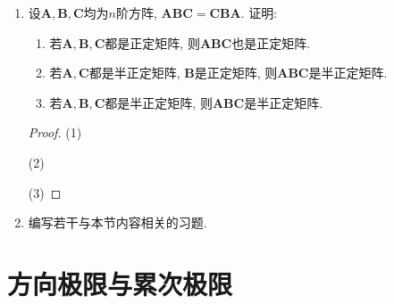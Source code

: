 \begin{3b}
\begin{enumerate}
\begin{enumerate}[label=(\arabic*)]
    \item 若\(\boldsymbol{A,B}\)都是正定矩阵, 则\(\boldsymbol{AB}\)也是正定矩阵.
    \item  若\(\boldsymbol{A,B}\)都是半正定矩阵, 则\(\boldsymbol{AB}\)也是半正定矩阵.
\end{enumerate}
\begin{proof}
(1)由于\(\boldsymbol{A}\)正定, 则有非异阵\(\boldsymbol{C}\)满足\(\boldsymbol{A}=\boldsymbol{C}^{\rm T}\boldsymbol{C}\), 
这是因为\(\boldsymbol{A}\)正定当且仅当\(\boldsymbol{A}\)合同于\(\boldsymbol{I}_n\), 
由于\(\boldsymbol{AB}=\boldsymbol{BA}\)且\(\boldsymbol{A,B}\)都是正定矩阵, 
于是\(\left(\boldsymbol{AB}\right)^{\rm T}=\boldsymbol{B}^{\rm T}\boldsymbol{A}^{\rm T}=\boldsymbol{BA}=\boldsymbol{AB}\), 从而\(\boldsymbol{AB}\)是对称的. 另一方面
\[\boldsymbol{AB}=\boldsymbol{BA}=\boldsymbol{BC}^{\rm T}\boldsymbol{C}=\boldsymbol{C}^{-1}\boldsymbol{CBC}^{\rm T}\boldsymbol{C},\]
从而\(\boldsymbol{AB}\)与\(\boldsymbol{CBC}^{\rm T}\)相似, 后者显然是正定的, 从而\(\boldsymbol{AB}\)正定.

(2)我们先证明, \(n\)阶实对称矩阵\(\boldsymbol{A}\)是半正定矩阵的充分必要条件是对于任意正实数\(t\), \(\boldsymbol{A}+t\boldsymbol{I}_n\)都是正定阵.
\end{proof}
\item 设\(\boldsymbol{A},\boldsymbol{B},\boldsymbol{C}\)均为\(n\)阶方阵, \(\boldsymbol{ABC=CBA}\). 证明:
\begin{enumerate}[label=(\arabic*)]
    \item 若\(\boldsymbol{A},\boldsymbol{B},\boldsymbol{C}\)都是正定矩阵, 则\(\boldsymbol{ABC}\)也是正定矩阵.
    \item 若\(\boldsymbol{A},\boldsymbol{C}\)都是半正定矩阵, \(\boldsymbol{B}\)是正定矩阵, 则\(\boldsymbol{ABC}\)是半正定矩阵.
    \item 若\(\boldsymbol{A},\boldsymbol{B},\boldsymbol{C}\)都是半正定矩阵, 则\(\boldsymbol{ABC}\)是半正定矩阵.
\end{enumerate}
\begin{proof}
(1)

(2)

(3)
\end{proof}
\item 编写若干与本节内容相关的习题.
\end{enumerate}
\end{3b}
\section{方向极限与累次极限}

